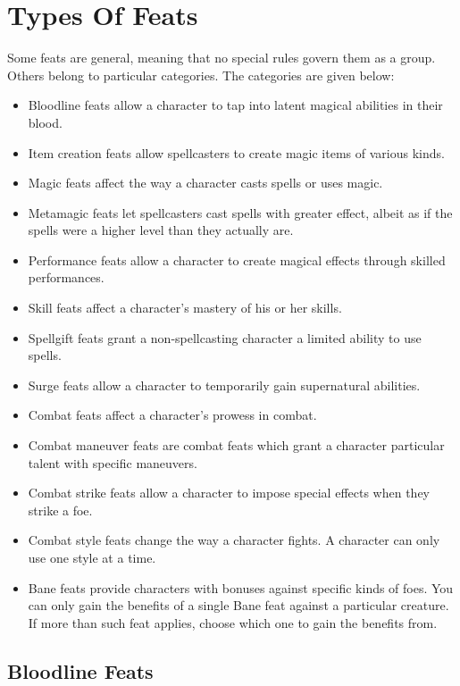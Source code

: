 \section{Types Of Feats}
Some feats are general, meaning that no special rules govern
them as a group.
Others belong to particular categories.
The categories are given below:
\begin{itemize}
    \item Bloodline feats allow a character to tap into latent magical abilities in their blood.
    \item Item creation feats allow spellcasters to create magic items of various kinds.
    \item Magic feats affect the way a character casts spells or uses magic.
    \item Metamagic feats let spellcasters cast spells with greater effect, albeit as if the spells were a higher level than they actually are.
    \item Performance feats allow a character to create magical effects through skilled performances.
    \item Skill feats affect a character's mastery of his or her skills.
    \item Spellgift feats grant a non-spellcasting character a limited ability to use spells.
    \item Surge feats allow a character to temporarily gain supernatural abilities.
    \item Combat feats affect a character's prowess in combat.
    \item Combat maneuver feats are combat feats which grant a character particular talent with specific maneuvers.
    \item Combat strike feats allow a character to impose special effects when they strike a foe.
    \item Combat style feats change the way a character fights.
        A character can only use one style at a time.
    \item Bane feats provide characters with bonuses against specific kinds of foes.
        You can only gain the benefits of a single Bane feat against a particular creature.
        If more than such feat applies, choose which one to gain the benefits from.
\end{itemize}

\subsection{Bloodline Feats}

